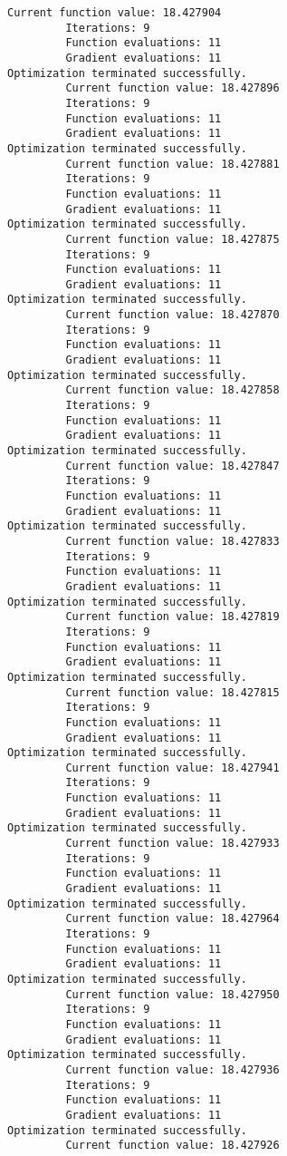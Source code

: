 \documentclass[11pt]{article}
\begin{document}
\begin{Verbatim}[commandchars=\\\{\}]
         Current function value: 18.427904
         Iterations: 9
         Function evaluations: 11
         Gradient evaluations: 11
Optimization terminated successfully.
         Current function value: 18.427896
         Iterations: 9
         Function evaluations: 11
         Gradient evaluations: 11
Optimization terminated successfully.
         Current function value: 18.427881
         Iterations: 9
         Function evaluations: 11
         Gradient evaluations: 11
Optimization terminated successfully.
         Current function value: 18.427875
         Iterations: 9
         Function evaluations: 11
         Gradient evaluations: 11
Optimization terminated successfully.
         Current function value: 18.427870
         Iterations: 9
         Function evaluations: 11
         Gradient evaluations: 11
Optimization terminated successfully.
         Current function value: 18.427858
         Iterations: 9
         Function evaluations: 11
         Gradient evaluations: 11
Optimization terminated successfully.
         Current function value: 18.427847
         Iterations: 9
         Function evaluations: 11
         Gradient evaluations: 11
Optimization terminated successfully.
         Current function value: 18.427833
         Iterations: 9
         Function evaluations: 11
         Gradient evaluations: 11
Optimization terminated successfully.
         Current function value: 18.427819
         Iterations: 9
         Function evaluations: 11
         Gradient evaluations: 11
Optimization terminated successfully.
         Current function value: 18.427815
         Iterations: 9
         Function evaluations: 11
         Gradient evaluations: 11
Optimization terminated successfully.
         Current function value: 18.427941
         Iterations: 9
         Function evaluations: 11
         Gradient evaluations: 11
Optimization terminated successfully.
         Current function value: 18.427933
         Iterations: 9
         Function evaluations: 11
         Gradient evaluations: 11
Optimization terminated successfully.
         Current function value: 18.427964
         Iterations: 9
         Function evaluations: 11
         Gradient evaluations: 11
Optimization terminated successfully.
         Current function value: 18.427950
         Iterations: 9
         Function evaluations: 11
         Gradient evaluations: 11
Optimization terminated successfully.
         Current function value: 18.427936
         Iterations: 9
         Function evaluations: 11
         Gradient evaluations: 11
Optimization terminated successfully.
         Current function value: 18.427926

\end{Verbatim}
\end{document}
